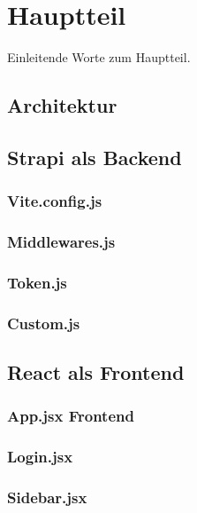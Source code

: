 \newpage

\section{Hauptteil} \label{hauptteil}
Einleitende Worte zum Hauptteil.
\subsection{Architektur} \label{architektur}


\subsection{Strapi als Backend} \label{strapiMain}

\subsubsection{Vite.config.js} \label{viteconfigjs}

\subsubsection{Middlewares.js} \label{middlewares}

\subsubsection{Token.js} \label{token}

\subsubsection{Custom.js} \label{custom}


\subsection{React als Frontend} \label{reactFrontend}

\subsubsection{App.jsx Frontend} \label{appfrontend}

\subsubsection{Login.jsx} \label{login}

\subsubsection{Sidebar.jsx} \label{sidebar}

